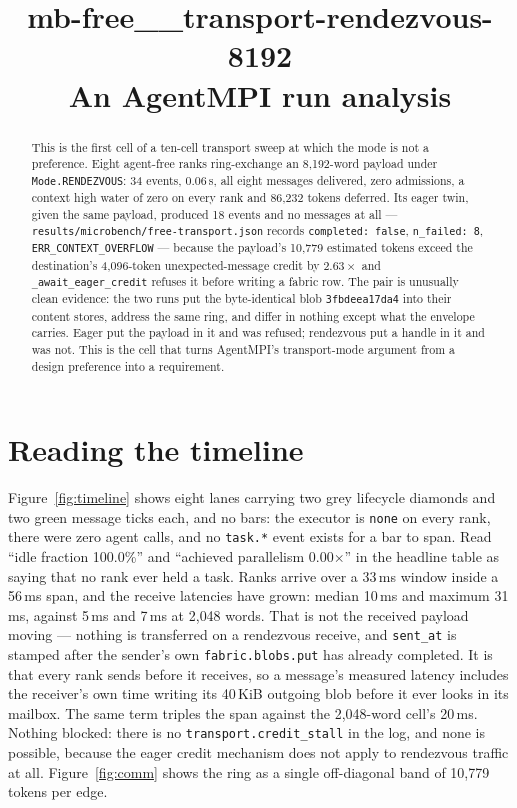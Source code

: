 \documentclass[11pt]{article}
\title{\textbf{mb-free\_\_transport-rendezvous-8192}\\[2pt]\large An AgentMPI run analysis}
\author{}
\date{}
\begin{document}
\maketitle

\begin{abstract}
This is the first cell of a ten-cell transport sweep at which the mode is not a
preference. Eight agent-free ranks ring-exchange an 8{,}192-word payload under
\texttt{Mode.RENDEZVOUS}: 34 events, 0.06\,s, all eight messages delivered, zero
admissions, a context high water of zero on every rank and 86{,}232 tokens deferred.
Its eager twin, given the same payload, produced 18 events and no messages at all ---
\texttt{results/microbench/free-transport.json} records \texttt{completed: false},
\texttt{n\_failed: 8}, \texttt{ERR\_CONTEXT\_OVERFLOW} --- because the payload's
10{,}779 estimated tokens exceed the destination's 4{,}096-token unexpected-message
credit by $2.63\times$ and \texttt{\_await\_eager\_credit} refuses it before writing
a fabric row. The pair is unusually clean evidence: the two runs put the
byte-identical blob \texttt{3fbdeea17da4} into their content stores, address the same
ring, and differ in nothing except what the envelope carries. Eager put the payload
in it and was refused; rendezvous put a handle in it and was not. This is the cell
that turns AgentMPI's transport-mode argument from a design preference into a
requirement.
\end{abstract}



\section{Reading the timeline}

Figure~\ref{fig:timeline} shows eight lanes carrying two grey lifecycle diamonds and
two green message ticks each, and no bars: the executor is \texttt{none} on every
rank, there were zero agent calls, and no \texttt{task.*} event exists for a bar to
span. Read ``idle fraction 100.0\%'' and ``achieved parallelism 0.00$\times$'' in the
headline table as saying that no rank ever held a task. Ranks arrive over a 33\,ms
window inside a 56\,ms span, and the receive latencies have grown: median 10\,ms and
maximum 31\,ms, against 5\,ms and 7\,ms at 2{,}048 words. That is not the received
payload moving --- nothing is transferred on a rendezvous receive, and
\texttt{sent\_at} is stamped after the sender's own \texttt{fabric.blobs.put} has
already completed. It is that every rank sends before it receives, so a message's
measured latency includes the receiver's own time writing its 40\,KiB outgoing blob
before it ever looks in its mailbox. The same term triples the span against the
2{,}048-word cell's 20\,ms. Nothing blocked: there is no
\texttt{transport.credit\_stall} in the log, and none is possible, because the eager
credit mechanism does not apply to rendezvous traffic at all.
Figure~\ref{fig:comm} shows the ring as a single off-diagonal band of 10{,}779 tokens
per edge.
\end{document}
